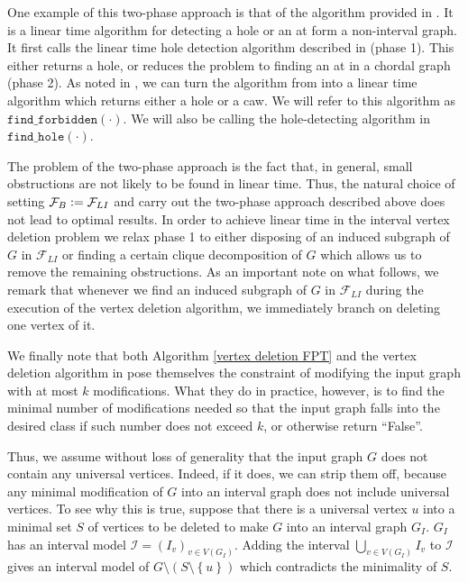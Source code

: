 \documentclass{article}
\theoremstyle{definition}
\newcommand{\defeq}{\vcentcolon=}
\begin{document}
    One example of this two-phase approach is
    that of the algorithm provided in \cite{aux1}.
    It is a linear time algorithm for detecting a hole
    or an at form a non-interval graph.
    It first calls the linear time hole detection algorithm
    described in \cite{aux2} (phase 1). 
    This either returns
    a hole, or reduces the problem to finding an at in a 
    chordal graph (phase 2).
    As noted in \cite{main}, we can 
    turn the algorithm from
    \cite{aux1} into a linear time 
    algorithm which returns either
    a hole or a caw. We will
    refer to this algorithm 
    as $\texttt{find\_forbidden}\left(\cdot\right)$.
    We will also be calling the
    hole-detecting algorithm
    in \cite{aux2}
    $\texttt{find\_hole}\left(\cdot\right)$.

    The problem of the two-phase approach is the fact that,
    in general, small obstructions are not likely to
    be found in linear time. 
    Thus, the natural choice
    of setting $\mathcal{F}_{B} \defeq \mathcal{F}_{LI}$
    and carry out the two-phase
    approach described above
    does not lead to optimal
    results.
    In order to achieve linear
    time in the interval vertex deletion problem
    we relax phase 1 to either disposing of
    an induced subgraph of $G$ in $\mathcal{F}_{LI}$
    or finding a certain clique decomposition
    of $G$ which allows us to remove
    the remaining obstructions.
    As an important note on what
    follows, we remark
    that whenever we
    find an induced subgraph of $G$ 
    in $\mathcal{F}_{LI}$ 
    during the execution
    of the vertex deletion
    algorithm, we immediately
    branch on deleting one vertex of it.

    We finally note that
    both Algorithm \ref{vertex deletion FPT}
    and the vertex deletion algorithm in \cite{main}
    pose themselves the constraint
    of modifying the input graph
    with at most $k$ modifications.
    What they do in practice, however,
    is to find the minimal number
    of modifications needed so that
    the input graph falls into the
    desired class if such number
    does not exceed $k$, or otherwise
    return ``False''.
    
    Thus, we assume 
    without loss of generality
    that the input graph
    $G$ does not contain
    any universal vertices.
    Indeed, if it does, 
    we can strip them off,
    because any minimal
    modification of $G$ 
    into an interval graph
    does not include
    universal vertices.
    To see why this is true,
    suppose that there is a 
    universal vertex $u$ into 
    a minimal set $S$ of 
    vertices to be deleted
    to make $G$ into an
    interval graph $G_{I}$.
    $G_{I}$ has an interval
    model $\mathcal{I} = \left(I_{v}\right)_{v \in V\left(G_{I}\right)}$.
    Adding the interval
    $\bigcup_{v \in V\left(G_{I}\right)} I_{v}$
    to $\mathcal{I}$ gives
    an interval model
    of $G \setminus \left(S \setminus \left\{u\right\}\right)$
    which contradicts
    the minimality of
    $S$.
    
\end{document}
